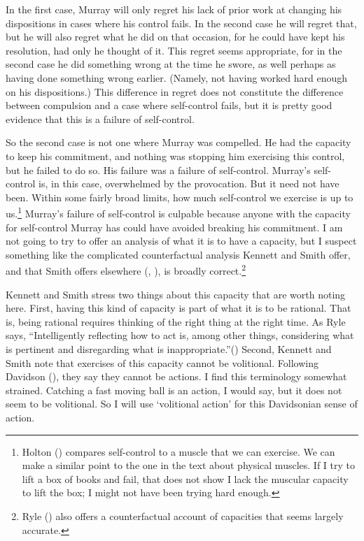 \documentclass[
  10pt,
  letterpaper,
  DIV=11,
  numbers=noendperiod,
  twoside]{scrartcl}
\begin{document}
In the first case, Murray will only regret his lack of prior work at
changing his dispositions in cases where his control fails. In the
second case he will regret that, but he will also regret what he did on
that occasion, for he could have kept his resolution, had only he
thought of it. This regret seems appropriate, for in the second case he
did something wrong at the time he swore, as well perhaps as having done
something wrong earlier. (Namely, not having worked hard enough on his
dispositions.) This difference in regret does not constitute the
difference between compulsion and a case where self-control fails, but
it is pretty good evidence that this is a failure of self-control.

So the second case is not one where Murray was compelled. He had the
capacity to keep his commitment, and nothing was stopping him exercising
this control, but he failed to do so. His failure was a failure of
self-control. Murray's self-control is, in this case, overwhelmed by the
provocation. But it need not have been. Within some fairly broad limits,
how much self-control we exercise is up to us.\footnote{Holton
  () compares self-control to a muscle
  that we can exercise. We can make a similar point to the one in the
  text about physical muscles. If I try to lift a box of books and fail,
  that does not show I lack the muscular capacity to lift the box; I
  might not have been trying hard enough.} Murray's failure of
self-control is culpable because anyone with the capacity for
self-control Murray has could have avoided breaking his commitment. I am
not going to try to offer an analysis of what it is to have a capacity,
but I suspect something like the complicated counterfactual analysis
Kennett and Smith offer, and that Smith offers elsewhere
(,
), is broadly correct.\footnote{Ryle
  () also offers a counterfactual
  account of capacities that seems largely accurate.}

Kennett and Smith stress two things about this capacity that are worth
noting here. First, having this kind of capacity is part of what it is
to be rational. That is, being rational requires thinking of the right
thing at the right time. As Ryle says, ``Intelligently reflecting how to
act is, among other things, considering what is pertinent and
disregarding what is inappropriate.''() Second, Kennett and Smith note that exercises of this capacity
cannot be volitional. Following Davidson
(), they say they cannot be actions. I
find this terminology somewhat strained. Catching a fast moving ball is
an action, I would say, but it does not seem to be volitional. So I will
use `volitional action' for this Davidsonian sense of action.
\end{document}
